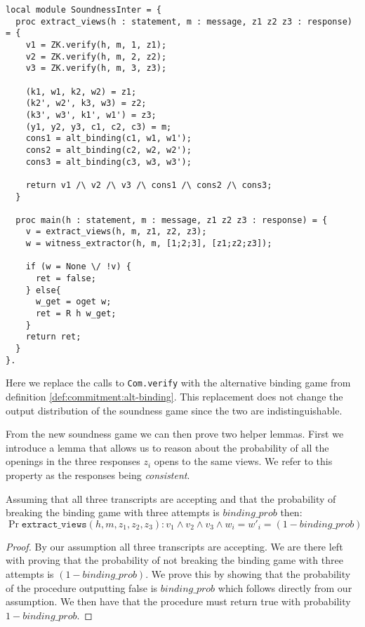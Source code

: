 \begin{lstlisting}[float,label=lst:zkboo:alt_soundness,caption=Soundness game for ZKBoo]
local module SoundnessInter = {
  proc extract_views(h : statement, m : message, z1 z2 z3 : response) = {
    v1 = ZK.verify(h, m, 1, z1);
    v2 = ZK.verify(h, m, 2, z2);
    v3 = ZK.verify(h, m, 3, z3);

    (k1, w1, k2, w2) = z1;
    (k2', w2', k3, w3) = z2;
    (k3', w3', k1', w1') = z3;
    (y1, y2, y3, c1, c2, c3) = m;
    cons1 = alt_binding(c1, w1, w1');
    cons2 = alt_binding(c2, w2, w2');
    cons3 = alt_binding(c3, w3, w3');

    return v1 /\ v2 /\ v3 /\ cons1 /\ cons2 /\ cons3;
  }

  proc main(h : statement, m : message, z1 z2 z3 : response) = {
    v = extract_views(h, m, z1, z2, z3);
    w = witness_extractor(h, m, [1;2;3], [z1;z2;z3]);

    if (w = None \/ !v) {
      ret = false;
    } else{
      w_get = oget w;
      ret = R h w_get;
    }
    return ret;
  }
}.
\end{lstlisting}

Here we replace the calls to \texttt{Com.verify} with the alternative binding
game from definition \ref{def:commitment:alt-binding}. This replacement does not
change the output distribution of the soundness game since the two are indistinguishable.

From the new soundness game we can then prove two helper lemmas. First we
introduce a lemma that allows us to reason about the probability of all the
openings in the three responses $z_{i}$ opens to the same views. We refer to
this property as the responses being \textit{consistent}.

\begin{lemma}
  \label{lem:zkboo:consistent-views}
  Assuming that all three transcripts are accepting and that the probability of
  breaking the binding game with three attempts is $binding\_{prob}$ then:
  \[
  \Pr{\texttt{extract\_views}(h, m, z_1, z_2, z_3) : v_1 \land v_2 \land v_3 \land w_{i} =
    w'_{i}} = (1-binding\_prob)
  \]
\end{lemma}
\begin{proof}
  By our assumption all three transcripts are accepting. We are there left with
  proving that the probability of not breaking the binding game with three
  attempts is $(1-binding\_{prob})$. We prove this by showing that the
  probability of the procedure outputting false is $binding\_{prob}$ which
  follows directly from our assumption.
  We then have that the procedure must return true with probability $1-binding\_{prob}$.
\end{proof}

